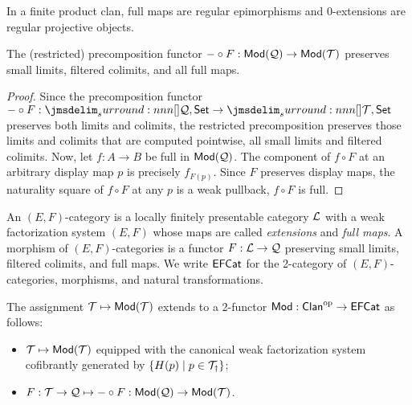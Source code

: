\documentclass[a4paper]{article}
\begin{document}
\begin{remark}
  In a finite product clan, full maps are regular epimorphisms and $0$-extensions are regular projective objects.
\end{remark}

\begin{lemma}
  The (restricted) precomposition functor $- \circ F : \mathsf{Mod}(\mathcal{Q}) \to \mathsf{Mod}(\mathcal{T})$ preserves small limits, filtered colimits, and all full maps.
\end{lemma}
\begin{proof}
  Since the precomposition functor $- \circ F : \funCat{\cQ}{\Set} \to \funCat{\cT}{\Set}$ preserves both limits and colimits, the restricted precomposition preserves those limits and colimits that are computed pointwise, \ie all small limits and filtered colimits.
  Now, let $f : A \to B$ be full in $\mathsf{Mod}(\mathcal{Q})$.
  The component of $f \circ F$ at an arbitrary display map $p$ is precisely $f_{F(p)}$.
  Since $F$ preserves display maps, the naturality square of $f \circ F$ at any $p$ is a weak pullback, \ie $f \circ F$ is full.
\end{proof}

\begin{definition}
  An $(E,F)$-category is a locally finitely presentable category $\mathcal{L}$ with a weak factorization system $(E,F)$ whose maps are called \emph{extensions} and \emph{full maps}.
  A morphism of $(E,F)$-categories is a functor $F : \mathcal{L} \to \mathcal{Q}$ preserving small limits, filtered colimits, and full maps.
  We write $\mathsf{EFCat}$ for the 2-category of $(E,F)$-categories, morphisms, and natural transformations.
\end{definition}

\begin{construction}
  The assignment $\mathcal{T} \mapsto \mathsf{Mod}(\mathcal{T})$ extends to a 2-functor $\mathsf{Mod} : \mathsf{Clan}^{\mathrm{op}} \to \mathsf{EFCat}$ as follows:
  \begin{itemize}
  \item $\mathcal{T} \mapsto \mathsf{Mod}(\mathcal{T})$ equipped with the canonical weak factorization system cofibrantly generated by $\{H(p) \mid p \in \mathcal{T}_{\dag}\}$;
  \item $F : \mathcal{T} \to \mathcal{Q} \mapsto - \circ F : \mathsf{Mod}(\mathcal{Q}) \to \mathsf{Mod}(\mathcal{T})$.
  \end{itemize}
\end{construction}
\end{document}
